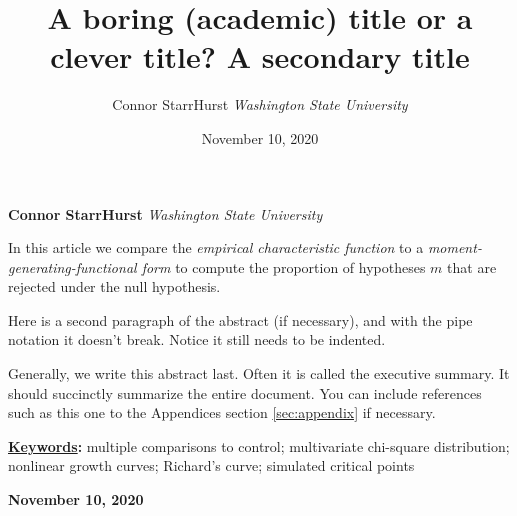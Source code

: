 \documentclass[]{article}
\title{\textbf{\textcolor{WSU.crimson}{A boring (academic) title or a clever title?}} \newline \textbf{\textcolor{WSU.gray}{A secondary title}}  }
\author{\Large Connor StarrHurst\vspace{0.05in} \newline\normalsize\emph{Washington State University}  }
\date{November 10, 2020}
\newcommand*{\authorfont}{\fontfamily{phv}\selectfont}
\renewenvironment{abstract}
 {{%
    \setlength{\leftmargin}{0mm}
    \setlength{\rightmargin}{\leftmargin}%
  }%
  \relax}
 {\endlist}
\begin{document}
	
%

{%
\setlength{\parindent}{0pt}
\thispagestyle{plain}
{\fontsize{18}{20}\selectfont\raggedright 
\maketitle  %

}

{
   \vskip 13.5pt\relax \normalsize\fontsize{11}{12} 
   
\textbf{\authorfont Connor StarrHurst} \hskip 15pt \emph{\small Washington State University}   

}

}








\begin{abstract}

    \hbox{\vrule height .2pt width 39.14pc}

    \vskip 8.5pt %

\noindent In this article we compare the \emph{empirical characteristic function}
\citep{Tukey:1977, Becker:1988} to a
\emph{moment-generating-functional form} to compute the proportion of
hypotheses \(m\) that are rejected under the null hypothesis.
\vspace{0.25in}

\noindent Here is a second paragraph of the abstract (if necessary), and
with the pipe notation it doesn't break. Notice it still needs to be
indented. \vspace{0.25in}

\noindent Generally, we write this abstract last. Often it is called the
executive summary. It should succinctly summarize the entire document.
You can include references such as this one to the Appendices section
\ref{sec:appendix} if necessary.


\vskip 8.5pt \noindent \textbf{\underline{Keywords}:} multiple comparisons to control; multivariate chi-square distribution;
nonlinear growth curves; Richard's curve; simulated critical points \par

    




    
    \hbox{\vrule height .2pt width 39.14pc}
    \vskip 5pt 
    \hfill \textbf{\textcolor{WSU.gray}{ November 10, 2020 } }
    \vskip 5pt 
    
\end{abstract}
\end{document}
